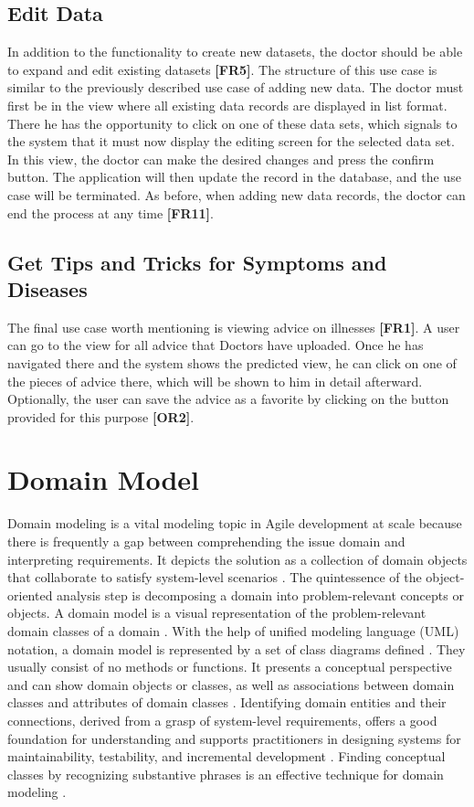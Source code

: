 \subsection{Edit Data}
In addition to the functionality to create new datasets, the doctor should be able to expand and edit existing datasets \textbf{[FR5]}. The structure of this use case is similar to the previously described use case of adding new data. The doctor must first be in the view where all existing data records are displayed in list format. There he has the opportunity to click on one of these data sets, which signals to the system that it must now display the editing screen for the selected data set. In this view, the doctor can make the desired changes and press the confirm button. The application will then update the record in the database, and the use case will be terminated. As before, when adding new data records, the doctor can end the process at any time \textbf{[FR11]}.

\subsection{Get Tips and Tricks for Symptoms and Diseases}
The final use case worth mentioning is viewing advice on illnesses \textbf{[FR1]}. A user can go to the view for all advice that Doctors have uploaded. Once he has navigated there and the system shows the predicted view, he can click on one of the pieces of advice there, which will be shown to him in detail afterward. Optionally, the user can save the advice as a favorite by clicking on the button provided for this purpose \textbf{[OR2]}. 

\section{Domain Model}
Domain modeling is a vital modeling topic in Agile development at scale because there is frequently a gap between comprehending the issue domain and interpreting requirements. It depicts the solution as a collection of domain objects that collaborate to satisfy system-level scenarios \cite{.safe}. The quintessence of the object-oriented analysis step is decomposing a domain into problem-relevant concepts or objects. A domain model is a visual representation of the problem-relevant domain classes of a domain \cite{.safe}. With the help of unified modeling language (UML) notation, a domain model is represented by a set of class diagrams defined \cite{.domainmodel}. They usually consist of no methods or functions. It presents a conceptual perspective and can show domain objects or classes, as well as associations between domain classes and attributes of domain classes \cite{.safe} \cite{.domainmodel}. Identifying domain entities and their connections, derived from a grasp of system-level requirements, offers a good foundation for understanding and supports practitioners in designing systems for maintainability, testability, and incremental development \cite{.safe}. Finding conceptual classes by recognizing substantive phrases is an effective technique for domain modeling \cite[p. 76]{.domainmodel}.

